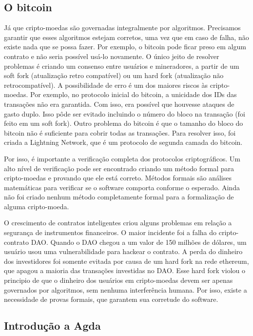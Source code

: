 \documentclass[12pt]{article}
\begin{document}
\subsection{O bitcoin}

Já que cripto-moedas são governadas integralmente por algoritmos.
Precisamos garantir que esses algoritmos estejam corretos, uma vez que em caso de falha,
não existe nada que se possa fazer. Por exemplo, o bitcoin pode ficar preso em algum contrato e não seria possível usá-lo novamente.
O único jeito de resolver problemas é criando um consenso entre usuários e mineradores,
a partir de um soft fork (atualização retro compatível) ou um hard fork (atualização não retrocompatível).
A possibilidade de erro é um dos maiores riscos às cripto-moedas.
Por exemplo, no protocolo inicial do bitcoin, a unicidade dos IDs das transações não era garantida.
Com isso, era possível que houvesse ataques de gasto duplo.
Isso pôde ser evitado incluindo o número do bloco na transação (foi feito em um soft fork).
Outro problema do bitcoin é que o tamanho do bloco do bitcoin não é suficiente para cobrir todas as transações.
Para resolver isso, foi criada a Lightning Network, que é um protocolo de segunda camada do bitcoin.

Por isso, é importante a verificação completa dos protocolos criptográficos.
Um alto nível de verificação pode ser encontrado criando um método formal para cripto-moedas e provando que ele está correto. Métodos formais são análises matemáticas para verificar se o software comporta conforme o esperado.
Ainda não foi criado nenhum método completamente formal para a formalização de alguma cripto-moeda.

O crescimento de contratos inteligentes criou alguns problemas em relação a segurança de instrumentos financeiros.
O maior incidente foi a falha do cripto-contrato DAO.
Quando o DAO chegou a um valor de 150 milhões de dólares, um usuário usou uma vulnerabilidade para hackear o contrato.
A perda do dinheiro dos investidores foi somente evitada por causa de um hard fork na rede ethereum,
que apagou a maioria das transações investidas no DAO.
Esse hard fork violou o principio de que o dinheiro dos usuários em cripto-moedas devem ser apenas governados por algoritmos,
sem nenhuma interferência humana.
Por isso, existe a necessidade de provas formais, que garantem sua corretude do software.

\subsection{Introdução a Agda}
\end{document}
